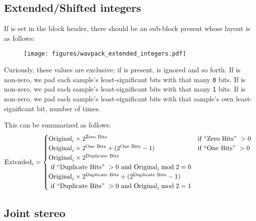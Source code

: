 \clearpage

\subsection{Extended/Shifted integers}

If  is set in the block header,
there should be an  sub-block present whose layout
is as follows:

\begin{figure}[h]
\texttt{[image: figures/wavpack\_extended\_integers.pdf]}
\end{figure}

Curiously, these values are exclusive; if  is present,
 is ignored and so forth.
If  is non-zero, we pad each sample's least-significant
bits with that many \texttt{0} bits.
If  is non-zero, we pad each sample's least-significant
bits with that many \texttt{1} bits.
If  is non-zero, we pad each sample's least-significant
bits with that sample's own least-significant bit,
 number of times.

This can be summarized as follows:
\begin{equation*}
\text{Extended}_i =
\begin{cases}
\text{Original}_i \times 2 ^ {\text{Zero Bits}} & \text{if ``{Zero Bits}'' } > 0 \\
\text{Original}_i \times 2 ^ {\text{One Bits}} + (2 ^ {\text{One Bits}} - 1) & \text{if ``{One Bits}'' } > 0 \\
\text{Original}_i \times 2 ^ {\text{Duplicate Bits}} \\
\text{ if ``{Duplicate Bits}'' } > 0 \text{ and }\text{Original}_i \bmod{2} = 0 \\
\text{Original}_i \times 2 ^ {\text{Duplicate Bits}} + (2 ^ {\text{Duplicate Bits}} - 1) \\
\text{ if ``{Duplicate Bits}'' } > 0 \text{ and }\text{Original}_i \bmod{2} = 1
\end{cases}
\end{equation*}

\subsection{Joint stereo}

